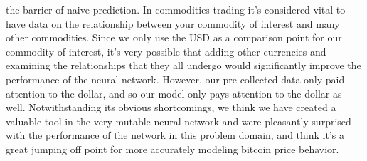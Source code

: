 \documentclass[a4paper,11pt]{article}
\begin{document}
the barrier of naive prediction.
\newline \newline
In commodities trading it's considered vital to have data on the relationship between your commodity of interest and many other
commodities.  Since we only use the USD as a comparison point for our commodity of interest, it's very possible that adding other
currencies and examining the relationships that they all undergo would significantly improve the performance of the neural 
network.  However, our pre-collected data only paid attention to the dollar, and so our model only pays attention to the dollar
as well.  Notwithstanding its obvious shortcomings, we think we have created a valuable tool in the very mutable neural network and
were pleasantly surprised with the performance of the network in this problem domain, and think it's a great jumping off
point for more accurately modeling bitcoin price behavior.
\end{document}
